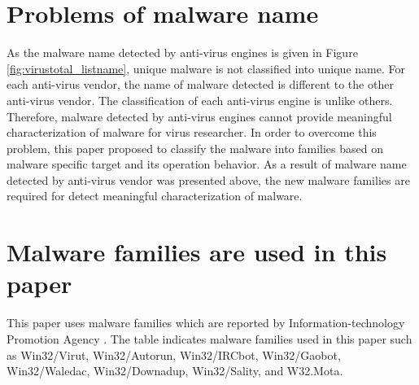 \section{Problems of malware name} 
As the malware name detected by anti-virus engines is given in Figure \ref{fig:virustotal_listname}, unique malware is not classified into unique name. For each anti-virus vendor, the name of malware detected is different to the other anti-virus vendor. The classification of each anti-virus engine is unlike others. Therefore, malware detected by anti-virus engines cannot provide meaningful characterization of malware for virus researcher. In order to overcome this problem, this paper proposed to classify the malware into families based on malware specific target and its operation behavior. 
As a result of malware name detected by anti-virus vendor was presented above, the new malware families are required for detect meaningful characterization of malware. 
\section{Malware families are used in this paper} 
This paper uses malware families which are reported by Information-technology Promotion Agency \cite{ipa}. The table indicates malware families used in this paper such as Win32/Virut, Win32/Autorun, Win32/IRCbot, Win32/Gaobot, Win32/Waledac, Win32/Downadup, Win32/Sality, and W32.Mota.


